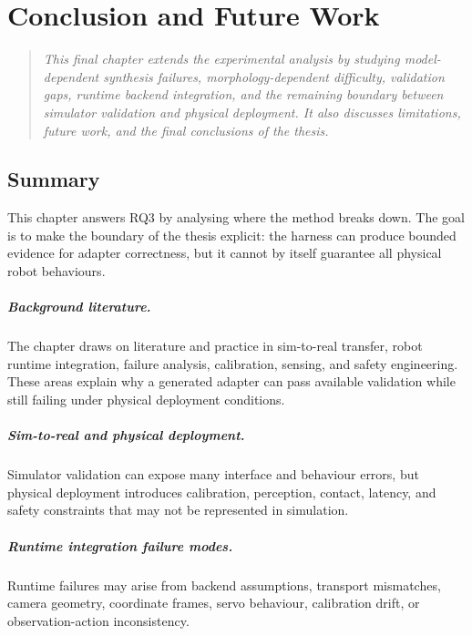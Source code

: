 \chapter[Conclusion and Future Work]{Conclusion and Future Work}\label{chapter:runtime-improvement}\label{chapter:discussion}\label{chapter:conclusion}

\begin{quote}\itshape
This final chapter extends the experimental analysis by studying
model-dependent synthesis failures, morphology-dependent difficulty, validation
gaps, runtime backend integration, and the remaining boundary between simulator
validation and physical deployment. It also discusses limitations, future work,
and the final conclusions of the thesis.
\end{quote}

\section[Summary]{Summary}
This chapter answers RQ3 by analysing where the method breaks down. The goal is
to make the boundary of the thesis explicit: the harness can produce bounded
evidence for adapter correctness, but it cannot by itself guarantee all
physical robot behaviours.

\paragraph{\textit{Background literature.}}
The chapter draws on literature and practice in sim-to-real transfer, robot
runtime integration, failure analysis, calibration, sensing, and safety
engineering. These areas explain why a generated adapter can pass available
validation while still failing under physical deployment conditions.

\paragraph{\textit{Sim-to-real and physical deployment.}}
Simulator validation can expose many interface and behaviour errors, but
physical deployment introduces calibration, perception, contact, latency, and
safety constraints that may not be represented in simulation.

\paragraph{\textit{Runtime integration failure modes.}}
Runtime failures may arise from backend assumptions, transport mismatches,
camera geometry, coordinate frames, servo behaviour, calibration drift, or
observation-action inconsistency.

